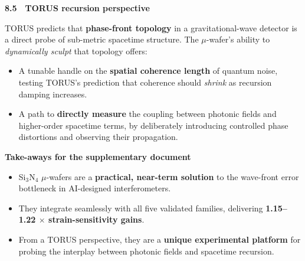 \documentclass[]{article}
\begin{document}
\textbf{8.5 TORUS recursion perspective}

TORUS predicts that \textbf{phase-front topology} in a gravitational-wave
detector is a direct probe of sub-metric spacetime structure. The
$\mu$-wafer's ability to \emph{dynamically sculpt} that topology offers:

\begin{itemize}
\item
  A tunable handle on the \textbf{spatial coherence length} of quantum
  noise, testing TORUS's prediction that coherence should \emph{shrink}
  as recursion damping increases.
\item
  A path to \textbf{directly measure} the coupling between photonic
  fields and higher-order spacetime terms, by deliberately introducing
  controlled phase distortions and observing their propagation.
\end{itemize}

\textbf{Take-aways for the supplementary document}

\begin{itemize}
\item
  Si$_3$N$_4$ $\mu$-wafers are a \textbf{practical, near-term solution} to
  the wave-front error bottleneck in AI-designed interferometers.
\item
  They integrate seamlessly with all five validated families, delivering
  \textbf{1.15--1.22 $\times$ strain-sensitivity gains}.
\item
  From a TORUS perspective, they are a \textbf{unique experimental
  platform} for probing the interplay between photonic fields and
  spacetime recursion.
\end{itemize}
\end{document}
